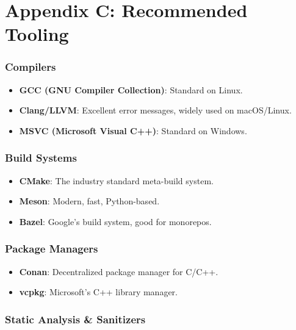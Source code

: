 \hypertarget{appendix-c-recommended-tooling}{%
\chapter{Appendix C: Recommended
Tooling}\label{appendix-c-recommended-tooling}}

\hypertarget{compilers}{%
\subsection{Compilers}\label{compilers}}

\begin{itemize}
\tightlist
\item
  \textbf{GCC (GNU Compiler Collection)}: Standard on Linux.
\item
  \textbf{Clang/LLVM}: Excellent error messages, widely used on
  macOS/Linux.
\item
  \textbf{MSVC (Microsoft Visual C++)}: Standard on Windows.
\end{itemize}

\hypertarget{build-systems}{%
\subsection{Build Systems}\label{build-systems}}

\begin{itemize}
\tightlist
\item
  \textbf{CMake}: The industry standard meta-build system.
\item
  \textbf{Meson}: Modern, fast, Python-based.
\item
  \textbf{Bazel}: Google's build system, good for monorepos.
\end{itemize}

\hypertarget{package-managers}{%
\subsection{Package Managers}\label{package-managers}}

\begin{itemize}
\tightlist
\item
  \textbf{Conan}: Decentralized package manager for C/C++.
\item
  \textbf{vcpkg}: Microsoft's C++ library manager.
\end{itemize}

\hypertarget{static-analysis-sanitizers}{%
\subsection{Static Analysis \&
Sanitizers}\label{static-analysis-sanitizers}}

